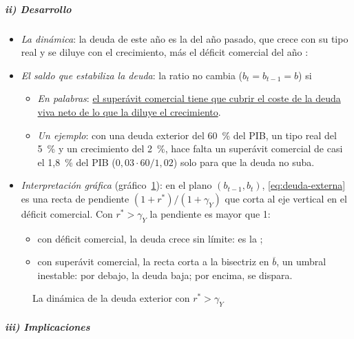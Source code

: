 \documentclass[11pt]{article}
\begin{document}
\subparagraph{ii) Desarrollo}

\begin{itemize}
\item \emph{La dinámica}: la deuda de este año es la del año pasado, que crece con su tipo real y se diluye con el crecimiento, más el déficit comercial del año :
\item \emph{El saldo que estabiliza la deuda}: la ratio no cambia ($b_t=b_{t-1}=b$) si
  \begin{itemize}
  \item \emph{En palabras}: \uline{el superávit comercial tiene que cubrir el coste de la deuda viva neto de lo que la diluye el crecimiento}.
  \item \emph{Un ejemplo}: con una deuda exterior del 60~\% del PIB, un tipo real del 5~\% y un crecimiento del 2~\%, hace falta un superávit comercial de casi el 1,8~\% del PIB ($0{,}03\cdot60/1{,}02$) solo para que la deuda no suba.
  \end{itemize}
\item \emph{Interpretación gráfica} (gráfico~\ref{fig:dinamica-deuda-externa}): en el plano $(b_{t-1},b_t)$, \eqref{eq:deuda-externa} es una recta de pendiente $(1+r^*)/(1+\gamma_Y)$ que corta al eje vertical en el déficit comercial. Con $r^*>\gamma_Y$ la pendiente es mayor que 1:
  \begin{itemize}
  \item con déficit comercial, la deuda crece sin límite: es la ;
  \item con superávit comercial, la recta corta a la bisectriz en $\overline b$, un umbral inestable: por debajo, la deuda baja; por encima, se dispara.
  \end{itemize}
\end{itemize}

\begin{figure}[H]
\centering
\caption{La dinámica de la deuda exterior con $r^*>\gamma_Y$}\label{fig:dinamica-deuda-externa}
\end{figure}

\subparagraph{iii) Implicaciones}
\end{document}
